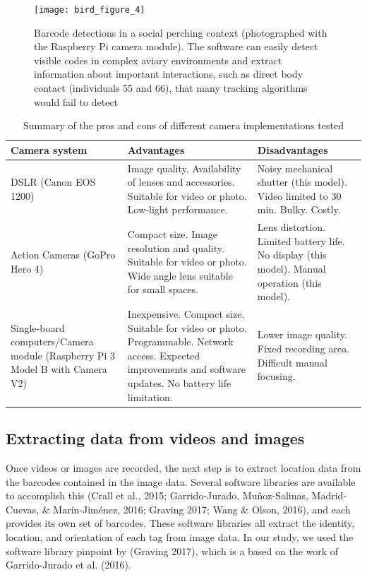 \documentclass[11pt,a4paper,oneside]{book}
\begin{document}
\begin{figure}[!htb]
    \centering
    \texttt{[image: bird\_figure\_4]}
    \caption{Barcode detections in a social perching context (photographed with the Raspberry Pi camera module). The software can easily detect visible codes in complex aviary environments and extract information about important interactions, such as direct body contact (individuals 55 and 66), that many tracking algorithms would fail to detect
}
    \label{fig:bird_figure_4}
\end{figure}
\begin{table}[!htb]
\caption{Summary of the pros and cons of different camera implementations tested}
    \begin{tabular}{| m{} | m{} | m{} |}
    \hline
         \textbf{Camera system} & \textbf{Advantages} & \textbf{Disadvantages} \\ \hline
         DSLR (Canon EOS 1200)	& Image quality. Availability of lenses and accessories. Suitable for video or photo. Low‐light performance.	& Noisy mechanical shutter (this model). Video limited to 30 min. Bulky. Costly. \\ \hline
         Action Cameras (GoPro Hero 4)	& Compact size. Image resolution and quality. Suitable for video or photo. Wide angle lens suitable for small spaces.	& Lens distortion. Limited battery life. No display (this model). Manual operation (this model). \\ \hline
         Single‐board computers/Camera module (Raspberry Pi 3 Model B with Camera V2)	&
         Inexpensive. Compact size. Suitable for video or photo. Programmable. Network access. Expected improvements and software updates. No battery life limitation.	& Lower image quality. Fixed recording area. Difficult manual focusing. \\
         \hline
    \end{tabular}
\label{table:bird_table}
\end{table}

\subsection{Extracting data from videos and images}
Once videos or images are recorded, the next step is to extract location data from the barcodes contained in the image data. Several software libraries are available to accomplish this (Crall et al., 2015; Garrido‐Jurado, Muñoz‐Salinas, Madrid‐Cuevas, & Marín‐Jiménez, 2016; Graving 2017; Wang & Olson, 2016), and each provides its own set of barcodes. These software libraries all extract the identity, location, and orientation of each tag from image data. In our study, we used the software library pinpoint by (Graving 2017), which is a based on the work of Garrido‐Jurado et al. (2016).
\end{document}

